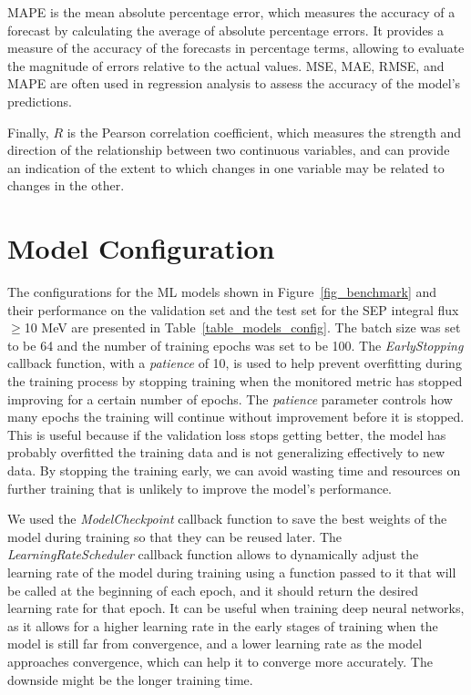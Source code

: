 MAPE is the mean absolute percentage error, which measures the accuracy of a forecast by calculating the average of absolute percentage errors. It provides a measure of the accuracy of the forecasts in percentage terms, allowing to evaluate the magnitude of errors relative to the actual values.
MSE, MAE, RMSE, and MAPE are often used in regression analysis to assess the accuracy of the model's predictions.

Finally, $R$ is the Pearson correlation coefficient, which measures the strength and direction of the relationship between two continuous variables, and can provide an indication of the extent to which changes in one variable may be related to changes in the other.
\section{Model Configuration}
\label{config_appendix}
The configurations for the ML models shown in Figure~\ref{fig_benchmark} and their performance on the validation set and the test set for the SEP integral flux $\geq$10 MeV are presented in Table~\ref{table_models_config}.
The batch size was set to be 64 and the number of training epochs was set to be 100. 
The \textit{EarlyStopping} callback function, with a \textit{patience} of 10, is used to help prevent overfitting during the training process by stopping training when the monitored metric has stopped improving for a certain number of epochs.
The \textit{patience} parameter controls how many epochs the training will continue without improvement before it is stopped. This is useful because if the validation loss stops getting better, the model has probably overfitted the training data and is not generalizing effectively to new data. By stopping the training early, we can avoid wasting time and resources on further training that is unlikely to improve the model's performance.

We used the \textit{ModelCheckpoint} callback function to save the best weights of the model during training so that they can be reused later.
The \textit{LearningRateScheduler} callback function allows to dynamically adjust the learning rate of the model during training using a function passed to it that will be called at the beginning of each epoch, and it should return the desired learning rate for that epoch. It can be useful when training deep neural networks, as it allows for a higher learning rate in the early stages of training when the model is still far from convergence, and a lower learning rate as the model approaches convergence, which can help it to converge more accurately. The downside might be the longer training time.

